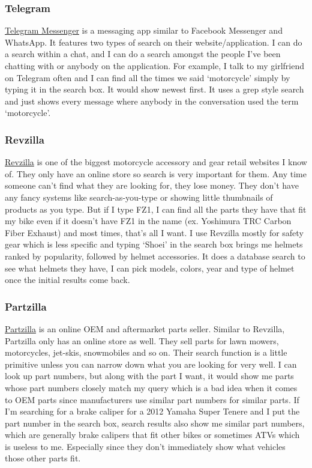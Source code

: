 \documentclass[10pt,letterpaper,bibliography=totoc]{scrartcl}
\begin{document}
\subsubsection{Telegram}
\href{www.telegram.org}{Telegram Messenger} is a messaging app similar to Facebook Messenger and WhatsApp. It features two types of search on their website/application. I can do a search within a chat, and I can do a search amongst the people I've been chatting with or anybody on the application. For example, I talk to my girlfriend on Telegram often and I can find all the times we said `motorcycle' simply by typing it in the search box. It would show newest first. It uses a grep style search and just shows every message where anybody in the conversation used the term `motorcycle'.

\subsubsection{Revzilla}
\href{www.revzilla.com}{Revzilla} is one of the biggest motorcycle accessory and gear retail websites I know of. They only have an online store so search is very important for them. Any time someone can't find what they are looking for, they lose money. They don't have any fancy systems like search-as-you-type or showing little thumbnails of products as you type. But if I type FZ1, I can find all the parts they have that fit my bike even if it doesn't have FZ1 in the name (ex. Yoshimura TRC Carbon Fiber Exhaust) and most times, that's all I want. I use Revzilla mostly for safety gear which is less specific and typing `Shoei' in the search box brings me helmets ranked by popularity, followed by helmet accessories. It does a database search to see what helmets they have, I can pick models, colors, year and type of helmet once the initial results come back. 

\subsubsection{Partzilla}
\href{www.partzilla.com}{Partzilla} is an online OEM and aftermarket parts seller. Similar to Revzilla, Partzilla only has an online store as well. They sell parts for lawn mowers, motorcycles, jet-skis, snowmobiles and so on. Their search function is a little primitive unless you can narrow down what you are looking for very well. I can look up part numbers, but along with the part I want, it would show me parts whose part numbers closely match my query which is a bad idea when it comes to OEM parts since manufacturers use similar part numbers for similar parts. If I'm searching for a brake caliper for a 2012 Yamaha Super Tenere and I put the part number in the search box, search results also show me similar part numbers, which are generally brake calipers that fit other bikes or sometimes ATVs which is useless to me. Especially since they don't immediately show what vehicles those other parts fit. \\
\end{document}
